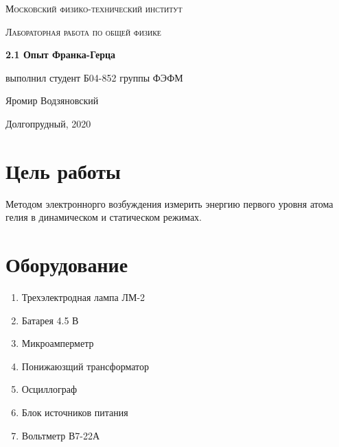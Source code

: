 \documentclass[a4paper]{article}
\begin{document}
\newcommand{\apple}{\char"F8FF}

\begin{titlepage}
	\centering
	\vspace{5cm}
    {\scshape\LARGE Московский физико-технический институт\par}
    

	\vspace{8cm}
	{\scshape\Large Лабораторная работа по общей физике \par}
	\vspace{2cm}
    {\huge\bfseries  2.1 Опыт Франка-Герца  \par}
	\vspace{4cm}
	\vfill
\begin{flushright}
	{\large выполнил студент Б04-852 группы ФЭФМ}\par
	\vspace{0.3cm}
	{\LARGE Яромир Водзяновский}
\end{flushright}
	
	\vfill
Долгопрудный, 2020
\end{titlepage}

\pagestyle{fancy} 
\fancyhead{}
\fancyhead[C]{}
\fancyfoot[C]{ \noindent\rule{\textwidth}{0.4pt} \thepage }

\newpage


\section{Цель работы}

Методом электроннорго возбуждения измерить энергию первого уровня атома гелия в динамическом 
и статическом режимах.

\section{Оборудование}
\begin{enumerate}
    \item Трехэлектродная лампа ЛМ-2
    \item Батарея 4.5 В
    \item Микроамперметр
    \item Понижаюзщий трансформатор
    \item Осциллограф
    \item Блок источников питания
    \item Вольтметр В7-22А
\end{enumerate}
\end{document}
